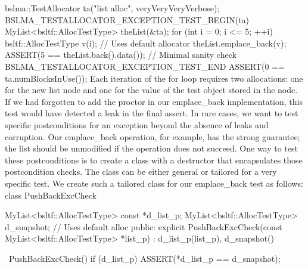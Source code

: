 {{{{{{{{bslma::TestAllocator ta("list alloc", veryVeryVeryVerbose);
BSLMA_TESTALLOCATOR_EXCEPTION_TEST_BEGIN(ta) {
    MyList<bsltf::AllocTestType> theList(&ta);
    for (int i = 0; i <= 5; ++i) {
        bsltf::AllocTestType v(i);  // Uses default allocator
        theList.emplace_back(v);
    }
    ASSERT(5 == theList.back().data());  // Minimal sanity check
} BSLMA_TESTALLOCATOR_EXCEPTION_TEST_END
ASSERT(0 == ta.numBlocksInUse());
Each iteration of the for loop requires two allocations: one for the new list node and one for the value of the test object stored in the node. If we had forgotten to add the proctor in our emplace_back implementation, this test would have detected a leak in the final assert.
In rare cases, we want to test specific postconditions for an exception beyond the absence of leaks and corruption. Our emplace_back operation, for example, has the strong guarantee; the list should be unmodified if the operation does not succeed. One way to test these postconditions is to create a class with a destructor that encapsulates those postcondition checks. The class can be either general or tailored for a very specific test. We create such a tailored class for our emplace_back test as follows:
class PushBackExcCheck {
    MyList<bsltf::AllocTestType> const *d_list_p;
    MyList<bsltf::AllocTestType>        d_snapshot; // Uses default alloc
  public:
    explicit PushBackExcCheck(const MyList<bsltf::AllocTestType> *list_p)
      : d_list_p(list_p), d_snapshot() { }

    ~PushBackExcCheck() {
        if (d_list_p) ASSERT(*d_list_p == d_snapshot);
    }

}}}}}}}}}
